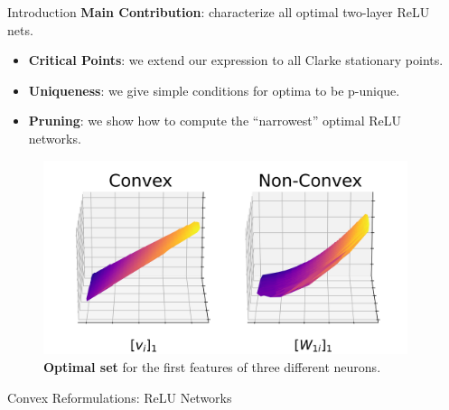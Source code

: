 \documentclass[12pt, usenames, dvipsnames]{beamer}
\newlength{\sepwidth}
\newlength{\colwidth}
\newcommand{\separatorcolumn}{\begin{column}{\sepwidth}\end{column}}
\newcommand{\blue}[1]{\textcolor{CBBlue}{#1}}
\begin{document}
\begin{frame}[t]
	\begin{columns}[t]
		\separatorcolumn

		\begin{column}{\colwidth}
			\vspace{-1.5em}
			\begin{block}{Introduction}
				\large
				{
					\Large
					\blue{\textbf{Main Contribution}}: characterize all optimal two-layer ReLU nets.
				}

				\begin{itemize}
					\item \textbf{Critical Points}: we extend our expression to all Clarke stationary points.

					\item \textbf{Uniqueness}: we give simple conditions for optima to be p-unique.

					\item \textbf{Pruning}: we show how to compute the ``narrowest'' optimal ReLU networks.
				\end{itemize}

				\vspace{-1em}

				\begin{figure}[]
					\centering
					\includegraphics[width=.9\textwidth]{assets/solution_sets_vis_270.png}
					\caption{\textbf{Optimal set} for the first features of three different
						neurons.}
					\vspace{-1em}
					\label{fig:solution-sets}
				\end{figure}

			\end{block}

			\begin{block}{Convex Reformulations: ReLU Networks}

				\begin{columns}[t]
					\begin{column}{0.62\textwidth}


\end{column}
\end{columns}
\end{block}
\end{column}
\end{columns}
\end{frame}
\end{document}
